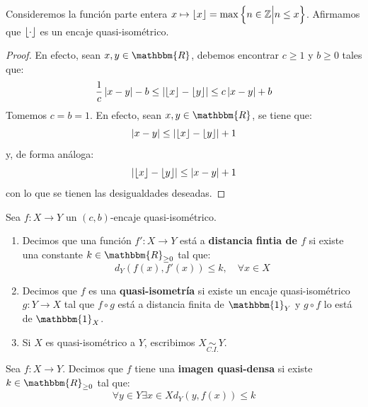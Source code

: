 \documentclass[12pt]{report}
\newcounter{it}
\theoremstyle{largebreak}
\newcommand\abs[1]{\ensuremath{\left|#1\right|}}
\newcommand\cf[3]{\ensuremath{#1:#2\rightarrow#3}}
\newcommand{\bbm}[1]{\ensuremath{\mathbbm{#1}}}
\begin{document}
    \begin{exa}
        Consideremos la función parte entera $x\mapsto \lfloor x\rfloor=\max\left\{n\in\mathbb{Z}\Big|n\leq x \right\}$. Afirmamos que $\lfloor \cdot\rfloor$ es un encaje quasi-isométrico.
    \end{exa}

    \begin{proof}
        En efecto, sean $x,y\in\bbm{R}$, debemos encontrar $c\geq1$ y $b\geq0$ tales que:
        \begin{equation*}
            \frac{1}{c}\abs{x-y}-b\leq\abs{\floor{x}-\floor{y}}\leq c\abs{x-y}+b
        \end{equation*}
        Tomemos $c=b=1$. En efecto, sean $x,y\in\bbm{R}$, se tiene que:
        \begin{equation*}
            \abs{x-y}\leq \abs{\floor{x}-\floor{y}}+1
        \end{equation*}
        y, de forma análoga:
        \begin{equation*}
            \abs{\floor{x}-\floor{y}}\leq\abs{x-y}+1
        \end{equation*}
        con lo que se tienen las desigualdades deseadas.
    \end{proof}

    \newcommand{\qisom}{\ensuremath{\underset{C.I.}{\sim}}}

    \begin{mydef}
        Sea $\cf{f}{X}{Y}$ un $(c,b)$-encaje quasi-isométrico.
        \begin{enumerate}[label = \textit{(\alph*)}]
            \item Decimos que una función $\cf{f'}{X}{Y}$ está a \textbf{distancia fintia de $f$} si existe una constante $k\in\bbm{R}_{\geq0}$ tal que:
            \begin{equation*}
                d_Y(f(x),f'(x))\leq k,\quad\forall x\in X
            \end{equation*}
            \item Decimos que $f$ es una \textbf{quasi-isometría} si existe un encaje quasi-isométrico $\cf{g}{Y}{X}$ tal que $f\circ g$ está a distancia finita de $\bbm{1}_Y$ y $g\circ f$ lo está de $\bbm{1}_X$.
            \item Si $X$ es quasi-isométrico a $Y$, escribimos $X\qisom Y$.
        \end{enumerate}
    \end{mydef}

    \begin{mydef}
        Sea $\cf{f}{X}{Y}$. Decimos que $f$ tiene una \textbf{imagen quasi-densa} si existe $k\in\bbm{R}_{\geq0}$ tal que:
        \begin{equation*}
            \forall y\in Y \exists x\in X d_Y(y,f(x))\leq k
        \end{equation*}
    \end{mydef}
\end{document}
